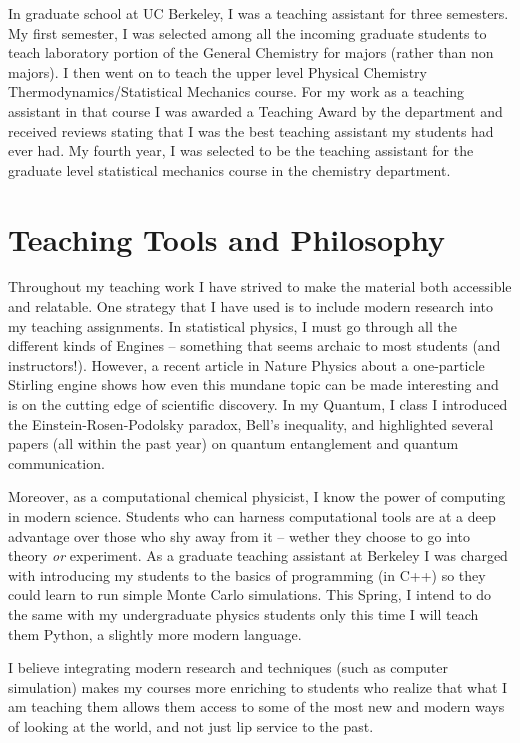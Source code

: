 \documentclass[11pt]{article}
\begin{document}
In graduate school at UC Berkeley, I was a teaching assistant for three semesters.  My first semester, I was selected among all the incoming graduate students to teach laboratory portion of the General Chemistry for majors (rather than non majors). I then went on to teach the upper level Physical Chemistry Thermodynamics/Statistical Mechanics course.  For my work as a teaching assistant in that course I was awarded a Teaching Award by the department and received reviews stating that I was the best teaching assistant my students had ever had.  My fourth year, I was selected to be the teaching assistant for the graduate level statistical mechanics course in the chemistry department.

\section{Teaching Tools and Philosophy}

Throughout my teaching work I have strived to make the material both accessible and relatable.  One strategy that I have used is to include modern research into my teaching assignments.  In statistical physics, I must go through all the different kinds of Engines -- something that seems archaic to most students (and instructors!).  However, a recent article in Nature Physics about a one-particle Stirling engine shows how even this mundane topic can be made interesting and is on the cutting edge of scientific discovery.  In my Quantum, I class I introduced the Einstein-Rosen-Podolsky paradox, Bell's inequality, and highlighted several papers (all within the past year) on quantum entanglement and quantum communication.

Moreover, as a computational chemical physicist, I know the power of computing in modern science.  Students who can harness computational tools are at a deep advantage over those who shy away from it  -- wether they choose to go into theory \emph{or} experiment.  As a graduate teaching assistant at Berkeley I was charged with introducing my students to the basics of programming (in C++) so they could learn to run simple Monte Carlo simulations.  This Spring, I intend to do the same with my undergraduate physics students only this time I will teach them Python, a slightly more modern language.

I believe integrating modern research and techniques (such as computer simulation) makes my courses more enriching to students who realize that what I am teaching them allows them access to some of the most new and modern ways of looking at the world, and not just lip service to the past.
\end{document}
